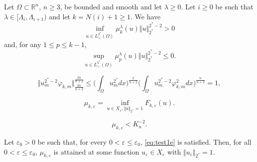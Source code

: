 \documentclass[10pt,a4paper]{amsart}
\newcommand{\Fke}{F_{k,\ve}}
\newcommand{\Om}{\Omega}
\newcommand{\R}{\mathbb{R}}
\newcommand{\mkle}{\mu_{k,\ve}}
\newcommand{\mpl}{\mu_{p}^{\lambda}}
\newcommand{\ve}{\varepsilon}
\newcommand{\vp}{\varphi}
\begin{document}
 \begin{prop}  \label{prop:signvp}
  Let $\Om \subset \R^n$, $n \ge 3$, be bounded and smooth and let  $\lambda \ge 0$. Let $i \ge0$ be such that $\lambda \in [\Lambda_i, \Lambda_{i+1})$ and let $k = N(i)+1 \ge 1$. We have  
\begin{equation} \label{infmukpos}
 \inf_{u \in L^{2^*}_{>}(\Om)} \mu_k^{\lambda}(u)  \Vert u \Vert_{2^*}^{2^*-2}  > 0
 \end{equation}
and, for any $1 \le p \le k-1$,
\begin{equation} \label{supmupneg}
\sup_{u \in L^{2^*}_{>}(\Om)} \mpl(u)  \Vert u \Vert_{2^*}^{2^*-2} \le 0 .
\end{equation}
\end{prop}

\begin{equation} \label{holder:spectre}
 \Vert u_m^{2^*-2} \vp_{k,m} \Vert_{\frac{2n}{n+2}}^{\frac{2n}{n+2}} \le \Big(\int_{\Om} u_m^{2^*}dx\Big)^{\frac{2}{n+2}} \Big( \int_{\Om} u_m^{2^*-2} \vp_{k,m}^2 dx\Big)^{\frac{n}{n+2}} = 1, 
 \end{equation}

\begin{equation} \label{mukeps}
\mkle = \inf_{u \in X_\ve, \Vert u \Vert_{2^*}=1} \Fke(u). 
\end{equation}

\begin{equation} \label{eq:test1e}
\mkle < K_n^{-2}.
\end{equation}

\begin{lemme} \label{lemme2}
Let $\ve_0 >0$ be such that, for every $0 < \ve \le \ve_0$, \eqref{eq:test1e} is satisfied. Then, for all $0 < \ve \le \ve_0$, $\mkle$ is attained at some function $u_\ve \in X_\ve $ with $\Vert u_\ve \Vert_{2^*} = 1$.   
\end{lemme}
\end{document}
